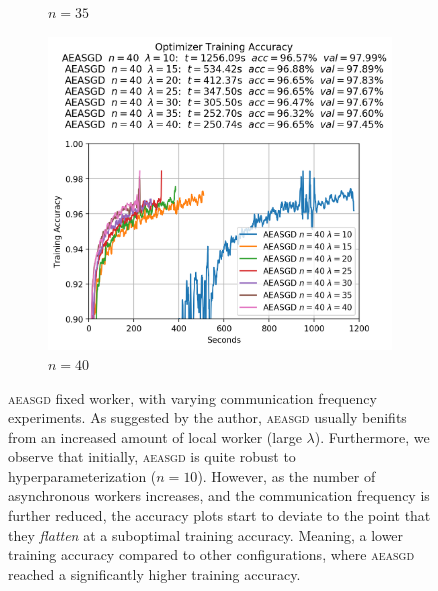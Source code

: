 \begin{figure}
\begin{subfigure}{.3\textwidth}
    \caption{$n = 35$}
  \end{subfigure}
  \begin{subfigure}{.3\textwidth}
    \centering
    \includegraphics[width=\linewidth]{resources/images/aeasgd_experiments_workers_40}
    \caption{$n = 40$}
  \end{subfigure}
  \caption{\textsc{aeasgd} fixed worker, with varying communication frequency experiments. As suggested by the author, \textsc{aeasgd} usually benifits from an increased amount of local worker (large $\lambda$). Furthermore, we observe that initially, \textsc{aeasgd} is quite robust to hyperparameterization ($n = 10$). However, as the number of asynchronous workers increases, and the communication frequency is further reduced, the accuracy plots start to deviate to the point that they \emph{flatten} at a suboptimal training accuracy. Meaning, a lower training accuracy compared to other configurations, where \textsc{aeasgd} reached a significantly higher training accuracy.}
  \label{fig:aeasgd_experiments_workers}
\end{figure}

